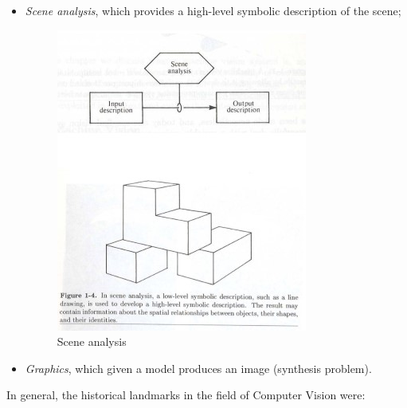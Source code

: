 \begin{itemize}
    \item \textit{Scene analysis}, which provides a high-level symbolic description of the scene;

    \begin{figure}[h!]
		\centering
		\includegraphics[scale = 1.5]{img/scene analysis.jpg}
		\caption{Scene analysis}
    \end{figure}

    \item \textit{Graphics}, which given a model produces an image (synthesis problem).
\end{itemize}

In general, the historical landmarks in the field of Computer Vision were:

